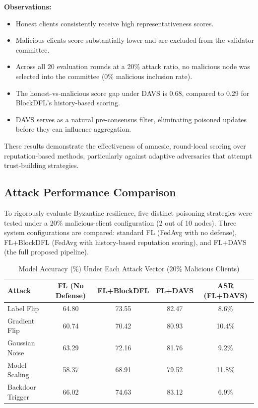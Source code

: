 \documentclass[12pt,a4paper]{article}
\begin{document}
\textbf{Observations:}
\begin{itemize}
    \item Honest clients consistently receive high representativeness scores.
    \item Malicious clients score substantially lower and are excluded from the validator committee.
    \item Across all 20 evaluation rounds at a 20\% attack ratio, no malicious node was selected into the committee (0\% malicious inclusion rate).
    \item The honest-vs-malicious score gap under DAVS is 0.68, compared to 0.29 for BlockDFL's history-based scoring.
    \item DAVS serves as a natural pre-consensus filter, eliminating poisoned updates before they can influence aggregation.
\end{itemize}
These results demonstrate the effectiveness of amnesic, round-local scoring over reputation-based methods, particularly against adaptive adversaries that attempt trust-building strategies.

\subsection{Attack Performance Comparison}
To rigorously evaluate Byzantine resilience, five distinct poisoning strategies were tested under a 20\% malicious-client configuration (2 out of 10 nodes). Three system configurations are compared: standard FL (FedAvg with no defense), FL+BlockDFL (FedAvg with history-based reputation scoring), and FL+DAVS (the full proposed pipeline).

\begin{table}[h]
\centering
\caption{Model Accuracy (\%) Under Each Attack Vector (20\% Malicious Clients)}
\begin{tabular}{|l|c|c|c|c|}
\hline
\textbf{Attack} & \textbf{FL (No Defense)} & \textbf{FL+BlockDFL} & \textbf{FL+DAVS} & \textbf{ASR (FL+DAVS)} \\ \hline
Label Flip & 64.80 & 73.55 & 82.47 & 8.6\% \\ \hline
Gradient Flip & 60.74 & 70.42 & 80.93 & 10.4\% \\ \hline
Gaussian Noise & 63.29 & 72.16 & 81.76 & 9.2\% \\ \hline
Model Scaling & 58.37 & 68.91 & 79.52 & 11.8\% \\ \hline
Backdoor Trigger & 66.02 & 74.63 & 83.12 & 6.9\% \\ \hline
\end{tabular}
\end{table}
\end{document}
